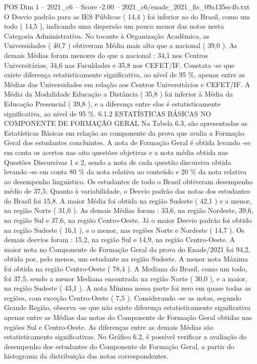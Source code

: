 \begin{textsample}{POS Dim 1 – 2021\_c6 – Score -2.00 – 2021\_c6/enade\_2021\_fis\_09a135ec4b.txt}
O Desvio padrão para as IES Públicas ( 14,4 ) foi inferior ao do Brasil, como um todo ( 14,5 ), indicando uma dispersão um pouco menor das notas nesta Categoria Administrativa.
No tocante à Organização Acadêmica, as Universidades ( 40,7 ) obtiveram Média mais alta que a nacional ( 39,0 ).
As demais Médias foram menores do que a nacional : 34,1 nos Centros Universitários, 34,6 nas Faculdades e 35,8 nos CEFET/IF.
Constata -se que existe diferença estatisticamente significativa, ao nível de 95 \%, apenas entre as Médias das Universidades em relação aos Centros Universitários e CEFET/IF.
A Média da Modalidade Educação a Distância ( 35,8 ) foi inferior à Média da Educação Presencial ( 39,8 ), e a diferença entre elas é estatisticamente significativa, ao nível de 95 \%. 6.1.2 ESTATÍSTICAS BÁSICAS NO COMPONENTE DE FORMAÇÃO GERAL Na Tabela 6.3, são apresentadas as Estatísticas Básicas em relação ao componente da prova que avalia a Formação Geral dos estudantes concluintes.
A nota de Formação Geral é obtida levando -se em conta os acertos nas oito questões objetivas e a nota média obtida nas Questões Discursivas 1 e 2, sendo a nota de cada questão discursiva obtida levando -se em conta 80 \% da nota relativa ao conteúdo e 20 \% da nota relativa ao desempenho linguístico.
Os estudantes de todo o Brasil obtiveram desempenho médio de 37,5.
Quanto à variabilidade, o Desvio padrão das notas dos estudantes do Brasil foi 15,8.
A maior Média foi obtida na região Sudeste ( 42,1 ) e a menor, na região Norte ( 31,0 ).
As demais Médias foram : 33,6, na região Nordeste, 39,6, na região Sul e 37,6, na região Centro-Oeste.
Já o maior Desvio padrão foi obtido na região Sudeste ( 16,1 ), e o menor, nas regiões Norte e Nordeste ( 14,7 ).
Os demais desvios foram : 15,2, na região Sul e 14,9, na região Centro-Oeste.
A maior nota no Componente de Formação Geral da prova do Enade/2021 foi 94,2, obtida por, pelo menos, um estudante na região Sudeste.
A menor nota Máxima foi obtida na região Centro-Oeste ( 78,4 ).
A Mediana do Brasil, como um todo, foi 37,5, sendo a menor Mediana encontrada na região Norte ( 30,0 ), e a maior, na região Sudeste ( 43,1 ).
A nota Mínima nessa parte foi zero em quase todas as regiões, com exceção Centro-Oeste ( 7,5 ).
Considerando -se as notas, segundo Grande Região, observa -se que não existe diferença estatisticamente significativa apenas entre as Médias das notas do Componente de Formação Geral obtidas nas regiões Sul e Centro-Oeste.
As diferenças entre as demais Médias são estatisticamente significativas.
No Gráfico 6.2, é possível verificar a avaliação do desempenho dos estudantes do Componente de Formação Geral, a partir do histograma da distribuição das notas correspondentes.

\end{textsample}
